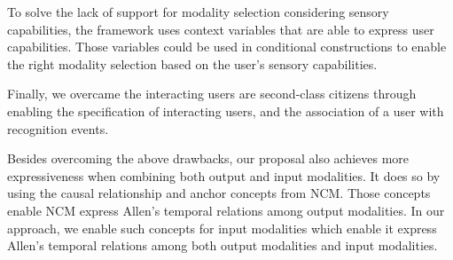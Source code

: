 To solve the lack of support for modality selection considering sensory
capabilities, the framework uses context variables that are able to express user
capabilities. Those variables could be used in conditional constructions to
enable the right modality selection based on the user’s sensory capabilities.

Finally, we overcame the interacting users are second-class citizens through
enabling the specification of interacting users, and the association of a user
with recognition events.

Besides overcoming the above drawbacks, our proposal also achieves more
expressiveness when combining both output and input modalities. It does so by
using the causal relationship and anchor concepts from NCM. Those concepts
enable NCM express Allen’s temporal relations among output modalities. In our
approach, we enable such concepts for input modalities which enable it express
Allen’s temporal relations among both output modalities and input modalities.